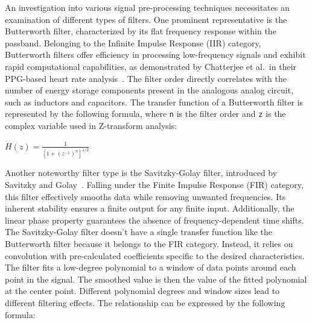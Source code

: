 An investigation into various signal pre-processing techniques necessitates an examination of different types of filters.
One prominent representative is the Butterworth filter, characterized by its flat frequency response within the passband.
Belonging to the Infinite Impulse Response (IIR) category, Butterworth filters offer efficiency in processing low-frequency signals and exhibit rapid computational capabilities, as demonstrated by Chatterjee et al.\ in their PPG-based heart rate analysis~\cite{chatterjeePPGBasedHeart2018}.
The filter order directly correlates with the number of energy storage components present in the analogous analog circuit, such as inductors and capacitors.
The transfer function of a Butterworth filter is represented by the following formula, where \texttt{n} is the filter order and \texttt{z} is the complex variable used in Z-transform analysis:
\Large
\begin{center}
    \begin{math}
        H(z) = \frac{1}{[1 + (z^{-1})^{n}]^{1/2}}
    \end{math}
\end{center}
\normalsize

Another noteworthy filter type is the Savitzky-Golay filter, introduced by Savitzky and Golay~\cite{savitzkySmoothingDifferentiationData1964}.
Falling under the Finite Impulse Response (FIR) category, this filter effectively smooths data while removing unwanted frequencies.
Its inherent stability ensures a finite output for any finite input.
Additionally, the linear phase property guarantees the absence of frequency-dependent time shifts.
The Savitzky-Golay filter doesn't have a single transfer function like the Butterworth filter because it belongs to the FIR category.
Instead, it relies on convolution with pre-calculated coefficients specific to the desired characteristics.
The filter fits a low-degree polynomial to a window of data points around each point in the signal.
The smoothed value is then the value of the fitted polynomial at the center point.
Different polynomial degrees and window sizes lead to different filtering effects.
The relationship can be expressed by the following formula:

